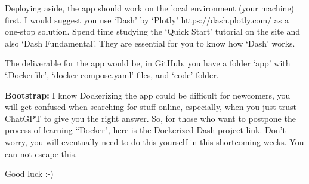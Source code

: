 \documentclass{homework}
\begin{document}
Deploying aside, the app should work on the local environment (your machine) first.
I would suggest you use `Dash' by `Plotly' \url{https://dash.plotly.com/} as a one-stop solution.
Spend time studying the `Quick Start' tutorial on the site and also `Dash Fundamental'.
They are essential for you to know how `Dash' works.

The deliverable for the app would be, in GitHub, you have a folder `app' with `.Dockerfile', `docker-compose.yaml' files, and `code' folder.

\textbf{Bootstrap:} I know Dockerizing the app could be difficult for newcomers, you will get confused when searching for stuff online, especially, when you just trust ChatGPT to give you the right answer.
So, for those who want to postpone the process of learning ``Docker", here is the Dockerized Dash project \href{https://github.com/chaklam-silpasuwanchai/Machine-Learning/tree/main/Appendix/Appendix\%20-\%20Dash\%20Plotly}{link}. Don't worry, you will eventually need to do this yourself in this shortcoming weeks. You can not escape this.


\vspace{0.01\textheight}


\begin{center}
    Good luck :-)
\end{center}
\end{document}

